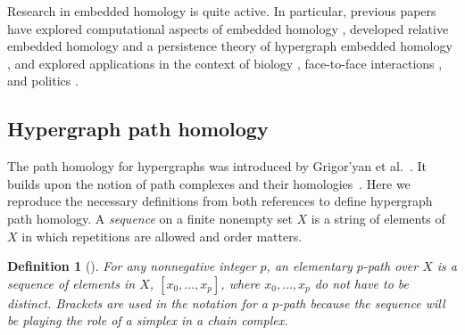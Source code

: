 \documentclass{amsart}
\newtheorem{definition}[theorem]{Definition}
\newcommand{\etal}            {{et al.}}
\begin{document}
Research in embedded homology is quite active. In particular, previous papers have explored computational aspects of embedded homology \cite{liu2024computing}, developed relative embedded homology \cite{ren2022embedded} and a persistence theory of hypergraph embedded homology \cite{liu2021HPC}, and explored applications in the context of biology \cite{liu2021HPC}, face-to-face interactions \cite{liu2021HPC}, and politics \cite{volic2024hypergraphs}. 



\subsection{Hypergraph path homology}
\label{sec:path-homology}

The path homology for hypergraphs was introduced by Grigor'yan \etal~\cite{GrigoryanJimenezMuranov2019}. 
It builds upon the notion of path complexes and their homologies~\cite{GrigoryanLinMuranov2020}.
Here we reproduce the necessary definitions from both references to define hypergraph path homology.
A \emph{sequence} on a finite nonempty set $X$ is a string of elements of $X$ in which repetitions are allowed and order matters.  

\begin{definition}[{\cite[page 566]{GrigoryanLinMuranov2020}}]
For any nonnegative integer $p$, an \emph{elementary $p$-path} over $X$ is a sequence of elements in $X$, 
$[x_0, \dots, x_p]$, where $x_0, \dots, x_p$ do not have to be distinct. Brackets are used in the notation for a $p$-path because the sequence will be playing the role of a simplex in a chain complex.
\end{definition}
\end{document}
